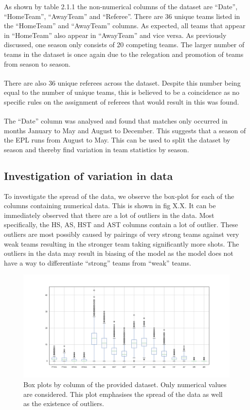 \documentclass[a4paper,12pt]{article}
\begin{document}
	As shown by table 2.1.1 the non-numerical columns of the dataset are “Date”, “HomeTeam”, “AwayTeam” and “Referee”. There are 36 unique teams listed in the “HomeTeam” and “AwayTeam” columns. As expected, all teams that appear in “HomeTeam” also appear in “AwayTeam” and vice versa. As previously discussed, one season only consists of 20 competing teams. The larger number of teams in the dataset is once again due to the relegation and promotion of teams from season to season.\\
	\\
	There are also 36 unique referees across the dataset. Despite this number being equal to the number of unique teams, this is believed to be a coincidence as no specific rules on the assignment of referees that would result in this was found.\\
	\\
	The “Date” column was analysed and found that matches only occurred in months January to May and August to December. This suggests that a season of the EPL runs from August to May. This can be used to split the dataset by season and thereby find variation in team statistics by season.  
	
	\subsection{Investigation of variation in data}
	
	To investigate the spread of the data, we observe the box-plot for each of the columns containing numerical data. This is shown in fig X.X.  It can be immediately observed that there are a lot of outliers in the data. Most specifically, the HS, AS, HST and AST columns contain a lot of outlier. These outliers are most possibly caused by pairings of very strong teams against very weak teams resulting in the stronger team taking significantly more shots. The outliers in the data may result in biasing of the model as the model does not have a way to differentiate “strong” teams from “weak” teams. 
	
	\begin{figure}[H]
		\renewcommand\thefigure{2.3}
		\centering
		
		\includegraphics[scale=0.4]{raw_box_plot.png}
		\caption{Box plots by column of the provided dataset. Only numerical values are considered. This plot emphasises the spread of the data as well as the existence of outliers.}
	\end{figure}
	
\end{document}
